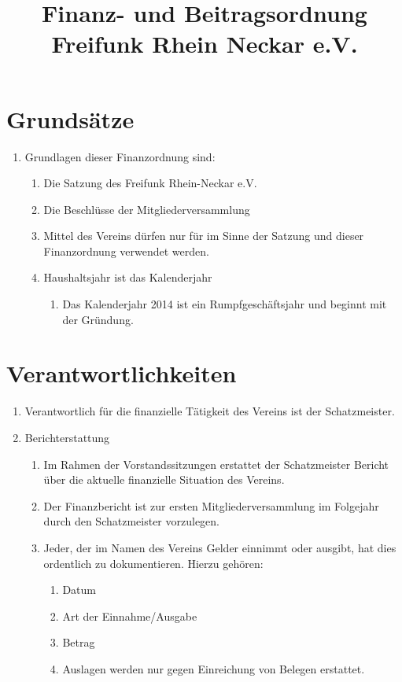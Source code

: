 \documentclass[12pt,a4paper,titlepage]{scrartcl}
\title{Finanz- und Beitragsordnung Freifunk Rhein Neckar e.V.}
\begin{document}
\maketitle
{}
\thispagestyle{empty}
\newpage
{}
\setcounter{page}{1}

\section{Grundsätze}
\begin{enumerate}
\item Grundlagen dieser Finanzordnung sind:
	\begin{enumerate}
	\item Die Satzung des Freifunk Rhein-Neckar e.V.
	\item Die Beschlüsse der Mitgliederversammlung 
	\item Mittel des Vereins dürfen nur für im Sinne der Satzung und dieser Finanzordnung 
verwendet werden. 
	\item Haushaltsjahr ist das Kalenderjahr 
		\begin{enumerate}
		\item Das Kalenderjahr 2014 ist ein Rumpfgeschäftsjahr und beginnt mit der Gründung. 
		\end{enumerate}
	\end{enumerate}
\end{enumerate}
	
\section{Verantwortlichkeiten}
\begin{enumerate}
\item Verantwortlich für die finanzielle Tätigkeit des Vereins ist der Schatzmeister. 
\item Berichterstattung 
	\begin{enumerate}
	\item Im Rahmen der Vorstandssitzungen erstattet der Schatzmeister Bericht über 
die aktuelle finanzielle Situation des Vereins. 
	\item Der Finanzbericht ist zur ersten Mitgliederversammlung im Folgejahr durch 
den Schatzmeister vorzulegen. 
	\item Jeder, der im Namen des Vereins Gelder einnimmt oder ausgibt, hat dies ordentlich zu dokumentieren. Hierzu gehören:
		\begin{enumerate}
		\item Datum 
		\item Art der Einnahme/Ausgabe 
		\item Betrag 
		\item Auslagen werden nur gegen Einreichung von Belegen erstattet. 
		\end{enumerate}
	\end{enumerate}
\end{enumerate}
\end{document}
